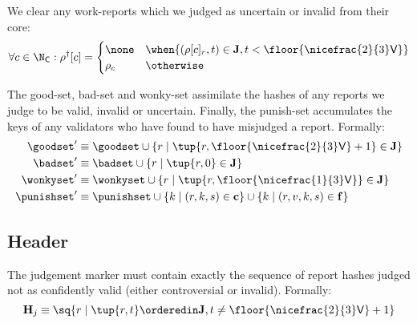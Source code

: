 We clear any work-reports which we judged as uncertain or invalid from their core:
\begin{equation}
  \forall c \in \N_\mathsf{C} : \rho^\dagger[c] = \begin{cases}
    \none &\when \{ (\rho[c]_r, t) \in \mathbf{J}, t < \floor{\nicefrac{2}{3}\mathsf{V}} \} \\
    \rho_c &\otherwise
  \end{cases}
\end{equation}

The good-set, bad-set and wonky-set assimilate the hashes of any reports we judge to be valid, invalid or uncertain. Finally, the punish-set accumulates the keys of any validators who have found to have misjudged a report. Formally:
\begin{align}
  \goodset' &\equiv \goodset \cup \{r \mid \tup{r, \floor{\nicefrac{2}{3}\mathsf{V}} + 1} \in \mathbf{J} \} \\
  \badset' &\equiv \badset \cup \{r \mid \tup{r, 0} \in \mathbf{J} \} \\
  \wonkyset' &\equiv \wonkyset \cup \{r \mid \tup{r, \floor{\nicefrac{1}{3}\mathsf{V}}} \in \mathbf{J} \} \\
  \punishset' &\equiv \punishset \cup \{ k \mid (r, k, s) \in \mathbf{c} \}\cup \{ k \mid (r, v, k, s) \in \mathbf{f} \}
\end{align}

\subsection{Header}\label{sec:judgementmarker}

The judgement marker must contain exactly the sequence of report hashes judged not as confidently valid (\ie either controversial or invalid). Formally:
\begin{equation}
  \mathbf{H}_j \equiv \sq{r \mid \tup{r, t} \orderedin \mathbf{J}, t \ne \floor{\nicefrac{2}{3}\mathsf{V}} + 1}
\end{equation}
